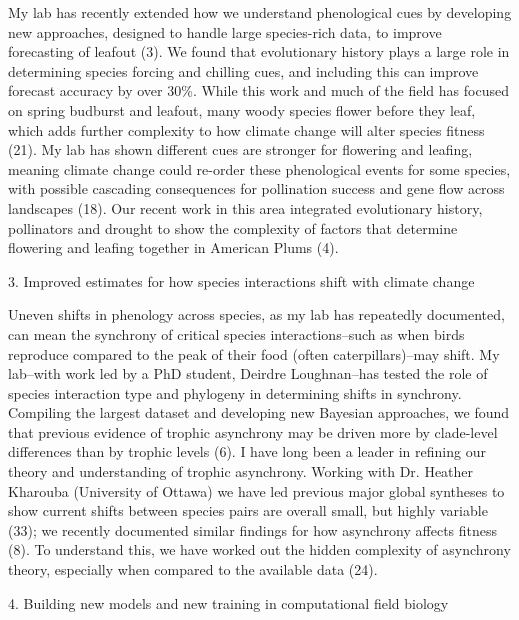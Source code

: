\documentclass[12pt,oneside]{article}
\begin{document}
My lab has recently extended how we understand phenological cues by developing new approaches, designed to handle large species-rich data, to improve forecasting of leafout (3). We found that evolutionary history plays a large role in determining species forcing and chilling cues, and including this can improve forecast accuracy by over 30\%. While this work and much of the field has focused on spring budburst and leafout, many woody species flower before they leaf, which adds further complexity to how climate change will alter species fitness (21). My lab has shown different cues are stronger for flowering and leafing, meaning climate change could re-order these phenological events for some species, with possible cascading consequences for pollination success and gene flow across landscapes (18). Our recent work in this area integrated evolutionary history, pollinators and drought to show the complexity of factors that determine flowering and leafing together in American Plums (4).


3. Improved estimates for how species interactions shift with climate change

Uneven shifts in phenology across species, as my lab has repeatedly documented, can mean the synchrony of critical species interactions--such as when birds reproduce compared to the peak of their food (often caterpillars)--may shift. My lab--with work led by a PhD student, Deirdre Loughnan--has tested the role of species interaction type and phylogeny in determining shifts in synchrony. Compiling the largest dataset and developing new Bayesian approaches, we found that previous evidence of trophic asynchrony may be driven more by clade-level differences than by trophic levels (6). I have long been a leader in refining our theory and understanding of trophic asynchrony. Working with Dr. Heather Kharouba (University of Ottawa) we have led previous major global syntheses to show current shifts between species pairs are overall small, but highly variable (33); we recently documented similar findings for how asynchrony affects fitness (8). To understand this, we have worked out the hidden complexity of asynchrony theory, especially when compared to the available data (24). 

4. Building new models and new training in computational field biology
\end{document}
